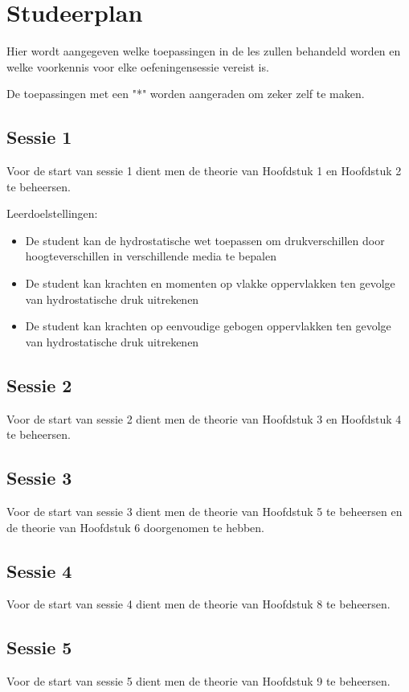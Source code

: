 \chapter{Studeerplan}
Hier wordt aangegeven welke toepassingen in de les zullen behandeld worden en welke voorkennis voor elke oefeningensessie vereist is.

De toepassingen met een "*" worden aangeraden om zeker zelf te maken.
	\section*{Sessie 1}
Voor de start van sessie 1 dient men de theorie van Hoofdstuk 1 en Hoofdstuk 2 te beheersen.

Leerdoelstellingen:
\begin{itemize}
	\item De student kan de hydrostatische wet toepassen om drukverschillen door hoogteverschillen in verschillende media te bepalen
	\item De student kan krachten en momenten op vlakke oppervlakken ten gevolge van hydrostatische druk uitrekenen
	\item De student kan krachten op eenvoudige gebogen oppervlakken ten gevolge van hydrostatische druk uitrekenen
\end{itemize}
	
	\section*{Sessie 2}
Voor de start van sessie 2 dient men de theorie van Hoofdstuk 3 en Hoofdstuk 4 te beheersen.

	\section*{Sessie 3}
Voor de start van sessie 3 dient men de theorie van Hoofdstuk 5 te beheersen en de theorie van Hoofdstuk 6 doorgenomen te hebben.

	\section*{Sessie 4}
Voor de start van sessie 4 dient men de theorie van Hoofdstuk 8 te beheersen.
	
	\section*{Sessie 5}
Voor de start van sessie 5 dient men de theorie van Hoofdstuk 9 te beheersen.